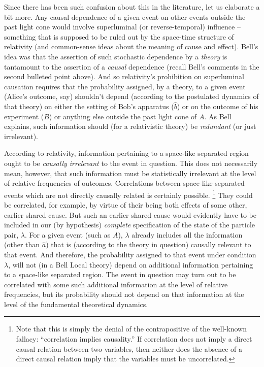 \documentclass[aps,prc,onecolumn,12pt]{revtex4-2}
\begin{document}
Since there has been such confusion about this in the literature, let
us elaborate a bit more.  Any causal dependence of a given event
on other events outside the past light cone would involve superluminal
(or reverse-temporal) influence -- something that is supposed to be
ruled out by the space-time structure of relativity (and common-sense
ideas about the meaning of cause and effect).  Bell's idea was
that the assertion of such stochastic dependence by a \emph{theory}
is tantamount to the assertion of a \emph{causal} dependence (recall
Bell's comments in the second bulleted point above).
And so relativity's prohibition on superluminal causation
requires that the probability assigned, by a theory,
to a given event (Alice's
outcome, say) shouldn't depend (according to the postulated dynamics
of that theory)
on either the setting of Bob's apparatus ($\hat{b}$)
or on the outcome of his experiment ($B$) or anything else outside the
past light cone of $A$.  As Bell explains, such
information should (for a relativistic theory) be \emph{redundant} (or
just irrelevant).

According to relativity, information pertaining to a
space-like separated region ought to be
\emph{causally irrelevant} to the event in question.  This does not
necessarily mean, however, that such information must be statistically
irrelevant at the level of relative frequencies of outcomes.
Correlations between space-like separated events which are not directly
causally related is certainly possible.
\footnote{Note that this is
simply the denial of the contrapositive of the well-known fallacy:
``correlation implies causality.''  If correlation does not imply a
direct causal relation between two variables, then neither does the
absence of a direct causal relation imply that the variables must be
uncorrelated.}
They could be
correlated, for example, by virtue of their being both effects of some
other, earlier shared cause.  But such an earlier shared cause would
evidently have to be included in our (by hypothesis)
\emph{complete} specification of
the state of the particle pair, $\lambda$.  For a given event (such
as $A$),
$\lambda$ already includes all the information (other than $\hat{a}$)
that is (according to the theory in question) causally
relevant to that event.  And therefore, the probability assigned to
that event under condition $\lambda$, will not (in a Bell Local theory)
depend on additional information pertaining to a space-like
separated region.  The event in question may turn out to be
correlated with some such additional information at the level of
relative frequencies, but its probability should not depend on that
information at the level of the fundamental theoretical dynamics.
\end{document}
